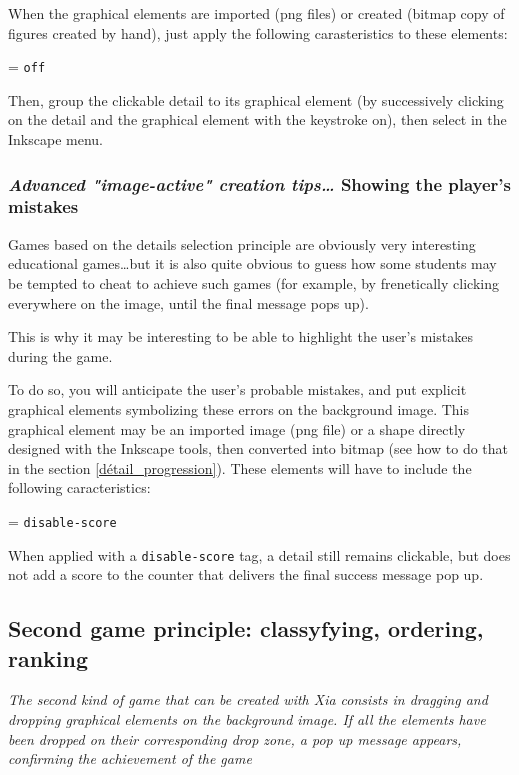 When the graphical elements are imported (png files) or created (bitmap copy 
of figures created by hand), just apply the following 
carasteristics to these elements:
\begin{center}
 = \verb|off|
\end{center}
Then, group the clickable detail to its graphical element (by successively 
clicking on the detail and the graphical element with the \Shift keystroke on),
then select  in the Inkscape  menu.

\subsubsection{\emph{Advanced "image-active" creation tips\ldots} Showing the player's mistakes}

Games based on the details selection principle are obviously very
interesting educational games\ldots but it is also quite obvious to guess how some 
students may be tempted to cheat to achieve such games (for example, by 
frenetically clicking everywhere on the image, until the final message pops up).

This is why it may be interesting to be able to 
highlight the user's mistakes during the game.

To do so, you will anticipate the user's probable mistakes, and 
put explicit graphical elements symbolizing these errors on the background image. 
This graphical element may be an imported image 
(png file) or a shape directly designed with the Inkscape tools, 
then converted into bitmap (see how to do that in the section 
\ref{détail_progression}). These elements will have to include the following caracteristics:
\begin{center}
 = \verb|disable-score| 
\end{center}
When applied with a \verb|disable-score| tag, a detail still remains clickable, but does not 
add a score to the counter that delivers the final success message pop up.

\subsection{Second game principle: classyfying, ordering, ranking}\label{gameDragAndDropsection}

\textit{The second kind of game that can be created with Xia consists in dragging and dropping graphical elements 
on the background image. If all the elements have been dropped on their corresponding drop zone, a pop up
message appears, confirming the achievement of the game}

